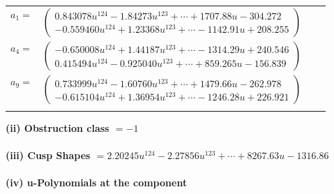 \documentclass[1p]{elsarticle_modified}
\theoremstyle{definition}
\begin{document}
\begin{tabular}{m{7pt} m{180pt} m{7pt} m{180pt} }
\flushright $a_{1}=$&$\begin{pmatrix}0.843078 u^{124}-1.84273 u^{123}+\cdots+1707.88 u-304.272\\-0.559460 u^{124}+1.23368 u^{123}+\cdots-1142.91 u+208.255\end{pmatrix}$ \\
\flushright $a_{4}=$&$\begin{pmatrix}-0.650008 u^{124}+1.44187 u^{123}+\cdots-1314.29 u+240.546\\0.415494 u^{124}-0.925040 u^{123}+\cdots+859.265 u-156.839\end{pmatrix}$ \\
\flushright $a_{9}=$&$\begin{pmatrix}0.733999 u^{124}-1.60760 u^{123}+\cdots+1479.66 u-262.978\\-0.615104 u^{124}+1.36954 u^{123}+\cdots-1246.28 u+226.921\end{pmatrix}$\\&\end{tabular}
\flushleft \textbf{(ii) Obstruction class $= -1$}\\~\\
\flushleft \textbf{(iii) Cusp Shapes $= 2.20245 u^{124}-2.27856 u^{123}+\cdots+8267.63 u-1316.86$}\\~\\
\newpage\renewcommand{\arraystretch}{1}
\flushleft \textbf{(iv) u-Polynomials at the component}\newline \\
\end{document}
